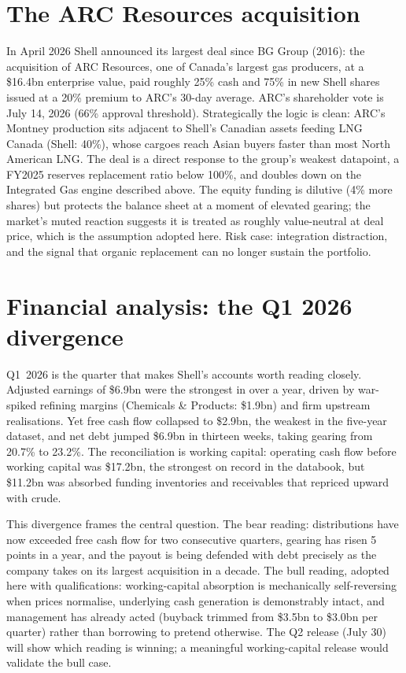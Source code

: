 \documentclass[10pt,a4paper]{article}
\newcommand{\about}{\raisebox{0.4ex}{\texttildelow}}
\begin{document}
\section{The ARC Resources acquisition}

In April 2026 Shell announced its largest deal since BG Group (2016): the acquisition of ARC Resources, one of Canada's largest gas producers, at a \$16.4bn enterprise value, paid roughly 25\% cash and 75\% in new Shell shares issued at a 20\% premium to ARC's 30-day average. ARC's shareholder vote is July 14, 2026 (66\% approval threshold). Strategically the logic is clean: ARC's Montney production sits adjacent to Shell's Canadian assets feeding LNG Canada (Shell: 40\%), whose cargoes reach Asian buyers faster than most North American LNG. The deal is a direct response to the group's weakest datapoint, a FY2025 reserves replacement ratio below 100\%, and doubles down on the Integrated Gas engine described above. The equity funding is dilutive (\about4\% more shares) but protects the balance sheet at a moment of elevated gearing; the market's muted reaction suggests it is treated as roughly value-neutral at deal price, which is the assumption adopted here. Risk case: integration distraction, and the signal that organic replacement can no longer sustain the portfolio.

\section{Financial analysis: the Q1 2026 divergence}

Q1~2026 is the quarter that makes Shell's accounts worth reading closely. Adjusted earnings of \$6.9bn were the strongest in over a year, driven by war-spiked refining margins (Chemicals \& Products: \$1.9bn) and firm upstream realisations. Yet free cash flow collapsed to \$2.9bn, the weakest in the five-year dataset, and net debt jumped \$6.9bn in thirteen weeks, taking gearing from 20.7\% to 23.2\%. The reconciliation is working capital: operating cash flow before working capital was \$17.2bn, the strongest on record in the databook, but \$11.2bn was absorbed funding inventories and receivables that repriced upward with crude.

This divergence frames the central question. The bear reading: distributions have now exceeded free cash flow for two consecutive quarters, gearing has risen \about5 points in a year, and the payout is being defended with debt precisely as the company takes on its largest acquisition in a decade. The bull reading, adopted here with qualifications: working-capital absorption is mechanically self-reversing when prices normalise, underlying cash generation is demonstrably intact, and management has already acted (buyback trimmed from \$3.5bn to \$3.0bn per quarter) rather than borrowing to pretend otherwise. The Q2 release (July 30) will show which reading is winning; a meaningful working-capital release would validate the bull case.
\end{document}
